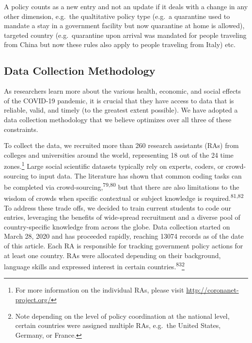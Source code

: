 \documentclass[
]{article}
\begin{document}
A policy counts as a new entry and not an update if it deals with a change in any other dimension, e.g.~the qualtitative policy type (e.g.~a quarantine used to mandate a stay in a government facility but now quarantine at home is allowed), targeted country (e.g.~quarantine upon arrival was mandated for people traveling from China but now these rules also apply to people traveling from Italy) etc.

\hypertarget{data-collection-methodology}{%
\subsection*{Data Collection Methodology}\label{data-collection-methodology}}

As researchers learn more about the various health, economic, and social effects of the COVID-19 pandemic, it is crucial that they have access to data that is reliable, valid, and timely (to the greatest extent possible). We have adopted a data collection methodology that we believe optimizes over all three of these constraints.

To collect the data, we recruited more than 260 research assistants (RAs) from colleges and universities around the world, representing 18 out of the 24 time zones.\footnote{For more information on the individual RAs, please visit \url{http://coronanet-project.org/}} Large social scientific datasets typically rely on experts, coders, or crowd-sourcing to input data. The literature has shown that common coding tasks can be completed via crowd-sourcing,\textsuperscript{79,80} but that there are also limitations to the wisdom of crowds when specific contextual or subject knowledge is required.\textsuperscript{81,82} To address these trade offs, we decided to train current students to code our entries, leveraging the benefits of wide-spread recruitment and a diverse pool of country-specific knowledge from across the globe. Data collection started on March 28, 2020 and has proceeded rapidly, reaching 13074 records as of the date of this article. Each RA is responsible for tracking government policy actions for at least one country. RAs were allocated depending on their background, language skills and expressed interest in certain countries.\textsuperscript{83}\footnote{Note depending on the level of policy coordination at the national level, certain countries were assigned multiple RAs, e.g.~the United States, Germany, or France.}
\end{document}
